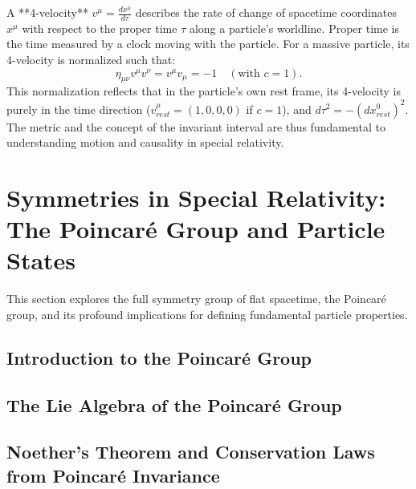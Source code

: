 \documentclass{amsart}
\theoremstyle{definition}
\theoremstyle{remark}
\begin{document}
A **4-velocity** $v^\mu = \frac{dx^\mu}{d\tau}$ describes the rate of change of spacetime coordinates $x^\mu$ with respect to the proper time $\tau$ along a particle's worldline. Proper time is the time measured by a clock moving with the particle. For a massive particle, its 4-velocity is normalized such that:
\begin{equation*}
  \eta_{\mu\nu} v^\mu v^\nu = v^\mu v_\mu = -1 \quad (\text{with } c=1).
\end{equation*}
This normalization reflects that in the particle's own rest frame, its 4-velocity is purely in the time direction ($v^\mu_{rest} = (1,0,0,0)$ if $c=1$), and $d\tau^2 = -(dx^0_{rest})^2$. The metric and the concept of the invariant interval are thus fundamental to understanding motion and causality in special relativity.

\section{Symmetries in Special Relativity: The Poincaré Group and Particle States}
\label{sec:poincare_particle_states}

This section explores the full symmetry group of flat spacetime, the Poincaré group, and its profound implications for defining fundamental particle properties.

\subsection{Introduction to the Poincaré Group}
\label{subsec:intro_poincare}

\subsection{The Lie Algebra of the Poincaré Group}
\label{subsec:poincare_algebra}

\subsection{Noether's Theorem and Conservation Laws from Poincaré Invariance}
\label{subsec:noether_poincare}
\end{document}
